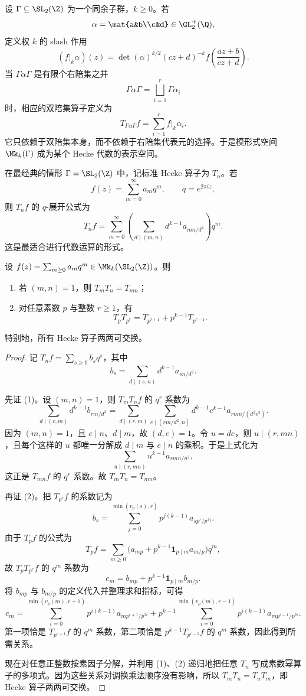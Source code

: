 设 $\Gamma\subseteq \SL_2(\Z)$ 为一个同余子群，$k\ge 0$。若
\[
\alpha=\mat{a&b\\c&d}\in \GL_2^+(\Q),
\]
定义权 $k$ 的 slash 作用
\[
(f|_k\alpha)(z)=\det(\alpha)^{k/2}(cz+d)^{-k}f\left(\frac{az+b}{cz+d}\right).
\]
当 $\Gamma\alpha\Gamma$ 是有限个右陪集之并
\[
\Gamma\alpha\Gamma=\bigsqcup_{i=1}^r \Gamma\alpha_i
\]
时，相应的双陪集算子定义为
\[
T_{\Gamma\alpha\Gamma}f=\sum_{i=1}^r f|_k\alpha_i.
\]
它只依赖于双陪集本身，而不依赖于右陪集代表元的选择。于是模形式空间 $\Mk_k(\Gamma)$ 成为某个 Hecke 代数的表示空间。

在最经典的情形 $\Gamma=\SL_2(\Z)$ 中，记标准 Hecke 算子为 $T_n$。若
\[
f(z)=\sum_{m=0}^{\infty}a_mq^m,\qquad q=e^{2\pi i z},
\]
则 $T_n f$ 的 $q$-展开公式为
\[
T_n f=\sum_{m=0}^{\infty}\left(\sum_{d\mid (m,n)} d^{k-1}a_{mn/d^2}\right)q^m.
\]
这是最适合进行代数运算的形式。

\begin{proposition}
设 $f(z)=\sum_{m\ge 0}a_mq^m\in \Mk_k(\SL_2(\Z))$。则
\begin{enumerate}[label=\textnormal{(\arabic*)}]
  \item 若 $(m,n)=1$，则 $T_mT_n=T_{mn}$；
  \item 对任意素数 $p$ 与整数 $r\ge 1$，有
  \[
  T_pT_{p^r}=T_{p^{r+1}}+p^{k-1}T_{p^{r-1}}.
  \]
\end{enumerate}
特别地，所有 Hecke 算子两两可交换。
\end{proposition}

\begin{proof}
记 $T_nf=\sum_{s\ge 0}b_sq^s$，其中
\[
b_s=\sum_{d\mid (s,n)}d^{k-1}a_{sn/d^2}.
\]

先证 (1)。设 $(m,n)=1$，则 $T_mT_nf$ 的 $q^r$ 系数为
\[
\sum_{d\mid (r,m)}d^{k-1}b_{rm/d^2}
=\sum_{d\mid (r,m)}\sum_{e\mid (rm/d^2,n)}d^{k-1}e^{k-1}a_{rmn/(d^2e^2)}.
\]
因为 $(m,n)=1$，且 $e\mid n$、$d\mid m$，故 $(d,e)=1$。令 $u=de$，则 $u\mid (r,mn)$，且每个这样的 $u$ 都唯一分解成 $d\mid m$ 与 $e\mid n$ 的乘积。于是上式化为
\[
\sum_{u\mid (r,mn)}u^{k-1}a_{rmn/u^2},
\]
这正是 $T_{mn}f$ 的 $q^r$ 系数。故 $T_mT_n=T_{mn}$。

再证 (2)。把 $T_{p^r}f$ 的系数记为
\[
b_s=\sum_{j=0}^{\min(v_p(s),r)}p^{j(k-1)}a_{sp^r/p^{2j}}.
\]
由于 $T_pf$ 的公式为
\[
T_pf=\sum_{m\ge 0}\bigl(a_{mp}+p^{k-1}\mathbf{1}_{p\mid m}a_{m/p}\bigr)q^m,
\]
故 $T_pT_{p^r}f$ 的 $q^m$ 系数为
\[
c_m=b_{mp}+p^{k-1}\mathbf{1}_{p\mid m}b_{m/p}.
\]
将 $b_{mp}$ 与 $b_{m/p}$ 的定义代入并整理求和指标，可得
\[
c_m=
\sum_{i=0}^{\min(v_p(m),r+1)}p^{i(k-1)}a_{mp^{r+1}/p^{2i}}
+ p^{k-1}\sum_{i=0}^{\min(v_p(m),r-1)}p^{i(k-1)}a_{mp^{r-1}/p^{2i}}.
\]
第一项恰是 $T_{p^{r+1}}f$ 的 $q^m$ 系数，第二项恰是 $p^{k-1}T_{p^{r-1}}f$ 的 $q^m$ 系数，因此得到所需关系。

现在对任意正整数按素因子分解，并利用 (1)、(2) 递归地把任意 $T_n$ 写成素数幂算子的多项式。因为这些关系对调换乘法顺序没有影响，所以 $T_mT_n=T_nT_m$，即 Hecke 算子两两可交换。
\end{proof}

